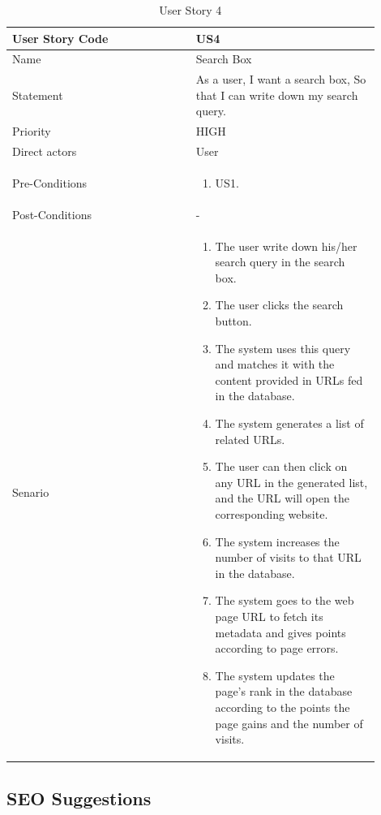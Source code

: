 \documentclass{scrartcl}
\begin{document}
\begin{table}[H]
  \caption{User Story 4}
  \begin{tabular}{p{0.45\linewidth} | p{0.45\linewidth}}
    \toprule
    User Story Code & US4 \\
    \midrule
    Name & Search Box \\
    \hline
    Statement & As a user, I want a search box, So that I can write down my search query. \\
    \hline
    Priority & HIGH \\
    \hline
    Direct actors & User \\
    \hline
    Pre-Conditions & {
                     \begin{enumerate}
                     \item US1.
                     \end{enumerate}
                     } \\
    \hline
    Post-Conditions & - \\
    \hline
    Senario & {
              \begin{enumerate}
              \item The user write down his/her search query in the search box.
              \item The user clicks the search button.
              \item The system uses this query and matches it with the content provided in URLs fed in the database.
              \item The system generates a list of related URLs.
              \item The user can then click on any URL in the generated list, and the URL will open the corresponding website.
              \item The system increases the number of visits to that URL in the database.
              \item The system goes to the web page URL to fetch its metadata and gives points according to page errors.
              \item The system updates the page's rank in the database according to the points the page gains and the number of visits.
              \end{enumerate}
              } \\
    \bottomrule
  \end{tabular}
\end{table}

\subsection{SEO Suggestions}
\end{document}
